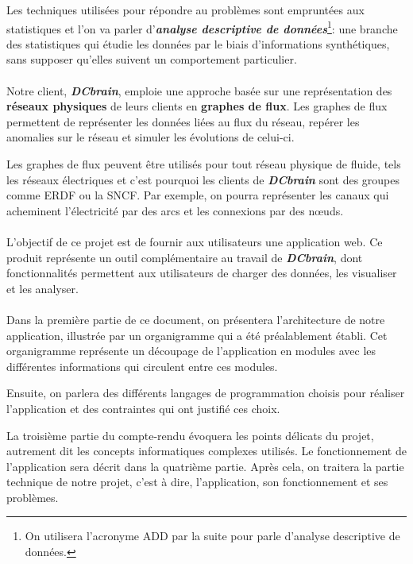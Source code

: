 	Les techniques utilisées pour répondre au problèmes sont empruntées aux statistiques et l'on va parler d'\textit{\textbf{analyse descriptive de données}}\footnote{On utilisera l'acronyme ADD par la suite pour parle d'analyse descriptive de données.}: une branche des statistiques qui étudie les données par le biais d'informations synthétiques, sans supposer qu'elles suivent un comportement particulier.
	\paragraph{}Notre client, \textit{\textbf{DCbrain}}, emploie une approche basée sur une représentation des \textbf{réseaux physiques} de leurs clients en \textbf{graphes de flux}. Les graphes de flux permettent de représenter les données liées au flux du réseau, repérer les anomalies sur le réseau et simuler les évolutions de celui-ci.
	
	Les graphes de flux peuvent être utilisés pour tout réseau physique de fluide, tels les réseaux électriques et c’est pourquoi les clients de \textit{\textbf{DCbrain}} sont des groupes comme ERDF ou la SNCF. Par exemple, on pourra représenter les canaux qui acheminent l'électricité par des arcs et les connexions par des nœuds.
	\paragraph{}L'objectif de ce projet est de fournir aux utilisateurs une application web. Ce produit représente un outil complémentaire au travail de \textit{\textbf{DCbrain}}, dont fonctionnalités permettent aux utilisateurs de charger des données, les visualiser et les analyser. 

	\paragraph{}Dans la première partie de ce document, on présentera l'architecture de notre application, illustrée par un organigramme qui a été préalablement établi. Cet organigramme représente un découpage de l'application en modules avec les différentes informations qui circulent entre ces modules.
	
	Ensuite, on parlera des différents langages de programmation choisis pour réaliser l'application et des contraintes qui ont justifié ces choix.
	
	La troisième partie du compte-rendu évoquera les points délicats du projet, autrement dit les concepts informatiques complexes utilisés.
	Le fonctionnement de l'application sera décrit dans la quatrième partie.
	Après cela, on traitera la partie technique de notre projet, c'est à dire, l'application, son fonctionnement et ses problèmes.
	
